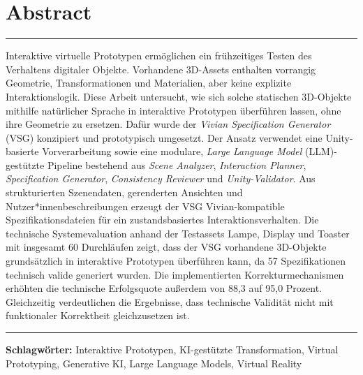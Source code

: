 \section*{Abstract}
\label{sec:abstract}
\noindent\rule{\linewidth}{0.8pt}\par\nopagebreak
\vspace{2pt}
Interaktive virtuelle Prototypen ermöglichen ein frühzeitiges Testen des Verhaltens digitaler Objekte. Vorhandene 3D-Assets enthalten vorrangig Geometrie, Transformationen und Materialien, aber keine explizite Interaktionslogik. Diese Arbeit untersucht, wie sich solche statischen 3D-Objekte mithilfe natürlicher Sprache in interaktive Prototypen überführen lassen, ohne ihre Geometrie zu ersetzen. Dafür wurde der \textit{Vivian Specification Generator} (VSG) konzipiert und prototypisch umgesetzt. Der Ansatz verwendet eine Unity-basierte Vorverarbeitung sowie eine modulare, \textit{Large Language Model} (LLM)-gestützte Pipeline bestehend aus \textit{Scene Analyzer}, \textit{Interaction Planner}, \textit{Specification Generator}, \textit{Consistency Reviewer} und \textit{Unity-Validator}. Aus strukturierten Szenendaten, gerenderten Ansichten und Nutzer*innenbeschreibungen erzeugt der VSG Vivian-kompatible Spezifikationsdateien für ein zustandsbasiertes Interaktionsverhalten. Die technische Systemevaluation anhand der Testassets Lampe, Display und Toaster mit insgesamt 60 Durchläufen zeigt, dass der VSG vorhandene 3D-Objekte grundsätzlich in interaktive Prototypen überführen kann, da 57 Spezifikationen technisch valide generiert wurden. Die implementierten Korrekturmechanismen erhöhten die technische Erfolgsquote außerdem von 88,3 auf 95,0 Prozent.
Gleichzeitig verdeutlichen die Ergebnisse, dass technische Validität nicht mit funktionaler Korrektheit gleichzusetzen ist.
\par\nopagebreak\vspace{2pt}
\noindent\rule{\linewidth}{0.8pt}

\vspace{1em}
\noindent\textbf{Schlagwörter:} Interaktive Prototypen, KI-gestützte Transformation, Virtual Prototyping, Generative KI, Large Language Models, Virtual Reality

